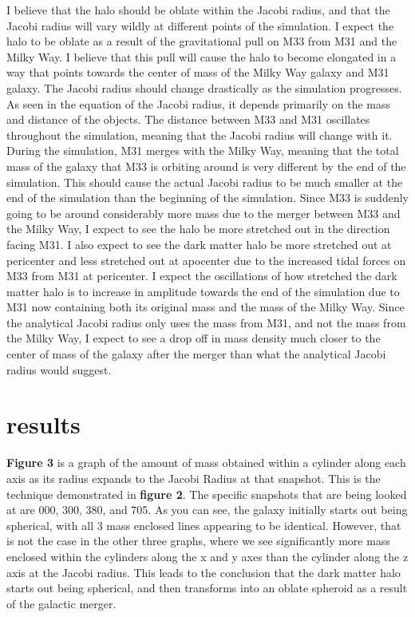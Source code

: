 \documentclass[fleqn,usenatbib]{mnras}
\begin{document}
        I believe that the halo should be oblate within the Jacobi radius, and that the Jacobi radius will vary wildly at different points of the simulation. I expect the halo to be oblate as a result of the gravitational pull on M33 from M31 and the Milky Way. I believe that this pull will cause the halo to become elongated in a way that points towards the center of mass of the Milky Way galaxy and M31 galaxy. The Jacobi radius should change drastically as the simulation progresses. As seen in the equation of the Jacobi radius, it depends primarily on the mass and distance of the objects. The distance between M33 and M31 oscillates throughout the simulation, meaning that the Jacobi radius will change with it. During the simulation, M31 merges with the Milky Way, meaning that the total mass of the galaxy that M33 is orbiting around is very different by the end of the simulation. This should cause the actual Jacobi radius to be much smaller at the end of the simulation than the beginning of the simulation. Since M33 is suddenly going to be around considerably more mass due to the merger between M33 and the Milky Way, I expect to see the halo be more stretched out in the direction facing M31. I also expect to see the dark matter halo be more stretched out at pericenter and less stretched out at apocenter due to the increased tidal forces on M33 from M31 at pericenter. I expect the oscillations of how stretched the dark matter halo is to increase in amplitude towards the end of the simulation due to M31 now containing both its original mass and the mass of the Milky Way. Since the analytical Jacobi radius only uses the mass from M31, and not the mass from the Milky Way, I expect to see a drop off in mass density much closer to the center of mass of the galaxy after the merger than what the analytical Jacobi radius would suggest. 

\section{results}

\textbf{Figure 3} is a graph of the amount of mass obtained within a cylinder along each axis as its radius expands to the Jacobi Radius at that snapshot. This is the technique demonstrated in \textbf{figure 2}. The specific snapshots that are being looked at are 000, 300, 380, and 705. As you can see, the galaxy initially starts out being spherical, with all 3 mass enclosed lines appearing to be identical. However, that is not the case in the other three graphs, where we see significantly more mass enclosed within the cylinders along the x and y axes than the cylinder along the z axis at the Jacobi radius. This leads to the conclusion that the dark matter halo starts out being spherical, and then transforms into an oblate spheroid as a result of the galactic merger.
\end{document}
